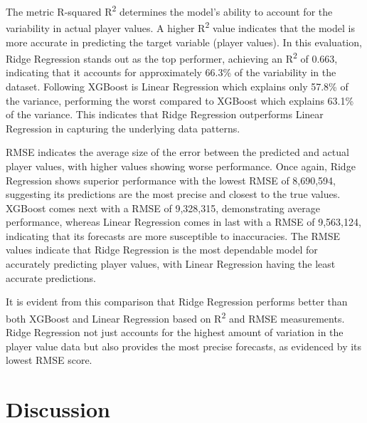\documentclass[12pt, a4paper,oneside]{book}
\numberwithin{equation}{section}
\begin{document}
The metric R-squared R\textsuperscript{2} determines the model's ability to account for the variability in actual player values. A higher R\textsuperscript{2} value indicates that the model is more accurate in predicting the target variable (player values). In this evaluation, Ridge Regression stands out as the top performer, achieving an R\textsuperscript{2} of 0.663, indicating that it accounts for approximately 66.3\% of the variability in the dataset. Following XGBoost is Linear Regression which explains only 57.8\% of the variance, performing the worst compared to XGBoost which explains 63.1\% of the variance. This indicates that Ridge Regression outperforms Linear Regression in capturing the underlying data patterns.

RMSE indicates the average size of the error between the predicted and actual player values, with higher values showing worse performance. Once again, Ridge Regression shows superior performance with the lowest RMSE of 8,690,594, suggesting its predictions are the most precise and closest to the true values. XGBoost comes next with a RMSE of 9,328,315, demonstrating average performance, whereas Linear Regression comes in last with a RMSE of 9,563,124, indicating that its forecasts are more susceptible to inaccuracies. The RMSE values indicate that Ridge Regression is the most dependable model for accurately predicting player values, with Linear Regression having the least accurate predictions.

It is evident from this comparison that Ridge Regression performs better than both XGBoost and Linear Regression based on R\textsuperscript{2} and RMSE measurements. Ridge Regression not just accounts for the highest amount of variation in the player value data but also provides the most precise forecasts, as evidenced by its lowest RMSE score.

\chapter{Discussion}\label{ch:5}
\end{document}
